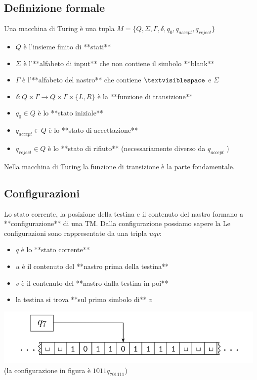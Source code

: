 \subsection{Definizione formale}
Una macchina di Turing è una tupla $M = \{Q, \Sigma, \Gamma,\delta, q_0, q_{accept},q_{reject}\}$ 
	\begin{itemize}
	\item $Q$ è l'insieme finito di **stati**
	\item $\Sigma$ è l'**alfabeto di input** che non contiene il simbolo **blank**
	\item $\Gamma$ è l'**alfabeto del nastro** che contiene $\textvisiblespace$ e $\Sigma$ 
	\item $\delta : Q\times \Gamma\rightarrow Q\times\Gamma\times\{L,R\}$ è la **funzione di transizione** 
	\item $q_0\in Q$ è lo  **stato iniziale** 
	\item $q_{accept}\in Q$ è lo **stato di accettazione**
	\item $q_{reject}\in Q$ è lo **stato di rifiuto** (necessariamente diverso da $q_{accept}$ )
\end{itemize}
Nella macchina di Turing la funzione di transizione è la parte fondamentale. 

\subsection{Configurazioni}
Lo stato corrente, la posizione della testina e il contenuto del nastro formano a **configurazione** di una TM.
Dalla configurazione possiamo sapere la 
Le configurazioni sono rappresentate da una tripla $uqv$:
\begin{itemize}
	\item $q$ è lo **stato corrente**
	\item $u$ è il contenuto del **nastro prima della testina** 
	\item $v$ è il contenuto del **nastro dalla testina in poi** 
	\item la testina si trova **sul primo simbolo di** $v$ 
\end{itemize}

\includegraphics[scale=0.5]{img/tm_conf.png}
(la configurazione in figura è $1011q_701111$)

